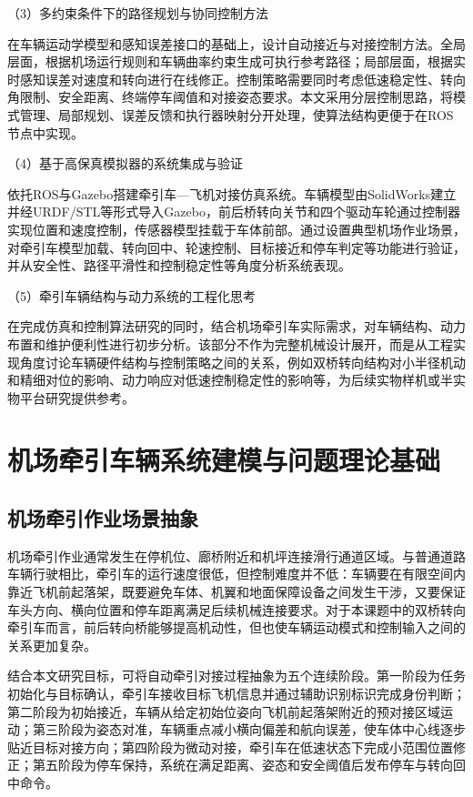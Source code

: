 \documentclass[UTF8,a4paper,12pt]{ctexart}
\begin{document}
（3）多约束条件下的路径规划与协同控制方法

在车辆运动学模型和感知误差接口的基础上，设计自动接近与对接控制方法。全局层面，根据机场运行规则和车辆曲率约束生成可执行参考路径；局部层面，根据实时感知误差对速度和转向进行在线修正。控制策略需要同时考虑低速稳定性、转向角限制、安全距离、终端停车阈值和对接姿态要求。本文采用分层控制思路，将模式管理、局部规划、误差反馈和执行器映射分开处理，使算法结构更便于在ROS节点中实现。

（4）基于高保真模拟器的系统集成与验证

依托ROS与Gazebo搭建牵引车---飞机对接仿真系统。车辆模型由SolidWorks建立并经URDF/STL等形式导入Gazebo，前后桥转向关节和四个驱动车轮通过控制器实现位置和速度控制，传感器模型挂载于车体前部。通过设置典型机场作业场景，对牵引车模型加载、转向回中、轮速控制、目标接近和停车判定等功能进行验证，并从安全性、路径平滑性和控制稳定性等角度分析系统表现。

（5）牵引车辆结构与动力系统的工程化思考

在完成仿真和控制算法研究的同时，结合机场牵引车实际需求，对车辆结构、动力布置和维护便利性进行初步分析。该部分不作为完整机械设计展开，而是从工程实现角度讨论车辆硬件结构与控制策略之间的关系，例如双桥转向结构对小半径机动和精细对位的影响、动力响应对低速控制稳定性的影响等，为后续实物样机或半实物平台研究提供参考。

\section{机场牵引车辆系统建模与问题理论基础}\label{_Toc229105294}

\subsection{机场牵引作业场景抽象}\label{_Toc229105295}

机场牵引作业通常发生在停机位、廊桥附近和机坪连接滑行通道区域。与普通道路车辆行驶相比，牵引车的运行速度很低，但控制难度并不低：车辆要在有限空间内靠近飞机前起落架，既要避免车体、机翼和地面保障设备之间发生干涉，又要保证车头方向、横向位置和停车距离满足后续机械连接要求。对于本课题中的双桥转向牵引车而言，前后转向桥能够提高机动性，但也使车辆运动模式和控制输入之间的关系更加复杂。

结合本文研究目标，可将自动牵引对接过程抽象为五个连续阶段。第一阶段为任务初始化与目标确认，牵引车接收目标飞机信息并通过辅助识别标识完成身份判断；第二阶段为初始接近，车辆从给定初始位姿向飞机前起落架附近的预对接区域运动；第三阶段为姿态对准，车辆重点减小横向偏差和航向误差，使车体中心线逐步贴近目标对接方向；第四阶段为微动对接，牵引车在低速状态下完成小范围位置修正；第五阶段为停车保持，系统在满足距离、姿态和安全阈值后发布停车与转向回中命令。
\end{document}
